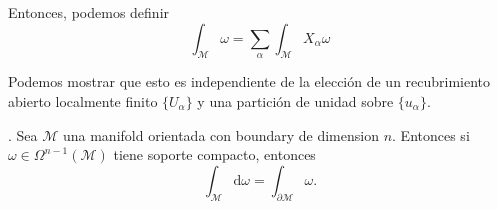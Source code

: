 \documentclass[../main]{subfiles}
\begin{document}
Entonces, podemos definir 
\begin{equation}
    \int_{\mathcal{M}} \omega=\sum_{\alpha} \int_{\mathcal{M}} X_{\alpha} \omega 
\end{equation}

Podemos mostrar que esto es independiente de la elección de un recubrimiento abierto localmente finito $\{ U_{\alpha}\}$ y una partición de unidad sobre $\{u_{\alpha}\}$.

\teorema{\textcolor{red}{Teorema de Stokes}}. Sea $\mathcal{M}$ una manifold orientada con boundary de dimension $n$. Entonces si $\omega \in \Omega^{n-1}(\mathcal{M})$ tiene soporte compacto, entonces 
\begin{equation}
    \int_{\mathcal{M}} \mathrm{d}\omega=\int_{\partial\mathcal{M}} \omega.
\end{equation}
\end{document}
